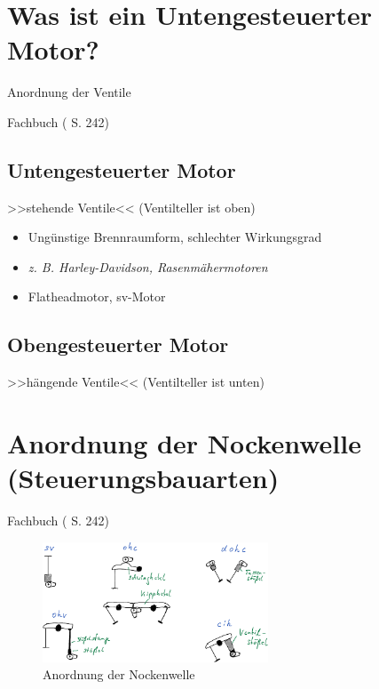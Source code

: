 \section{Was ist ein Untengesteuerter
Motor?}\label{was-ist-ein-untengesteuerter-motor}

Anordnung der Ventile

Fachbuch (\textcite{brand:2020:fachkundeKfz} S. 242)

\subsection{Untengesteuerter Motor}\label{untengesteuerter-motor}

>>stehende Ventile<< (Ventilteller ist oben)

\begin{itemize}
\item
  Ungünstige Brennraumform, schlechter Wirkungsgrad
\item
  \emph{z. B. Harley-Davidson, Rasenmähermotoren}
\item
  Flatheadmotor, sv-Motor
\end{itemize}

\subsection{Obengesteuerter Motor}\label{obengesteuerter-motor}

>>hängende Ventile<< (Ventilteller ist unten)

\section{Anordnung der Nockenwelle
(Steuerungsbauarten)}\label{anordnung-der-nockenwelle-steuerungsbauarten}

Fachbuch (\textcite{brand:2020:fachkundeKfz} S. 242)

\begin{figure}[!ht]%
\centering
\includegraphics[width=0.6\textwidth]{images/Skizze/01_Anordnung-der-Nockenwelle_Skizze.pdf}
\caption{Anordnung der Nockenwelle}
\end{figure}

